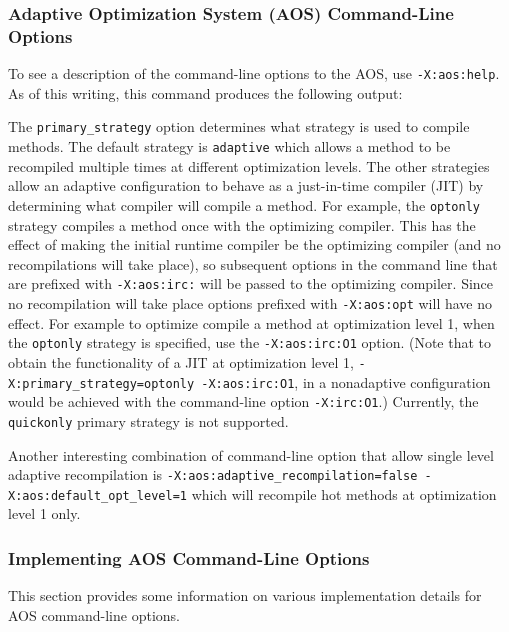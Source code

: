 \subsubsection{Adaptive Optimization System (AOS) Command-Line Options}

To see a description of the command-line options to the
AOS, use {\tt -X:aos:help}.
As of this writing, this command produces the following output:

\T \begin{tiny}

\T \end{tiny}

The {\tt primary\_strategy} option determines what strategy is used to compile
methods.
The default strategy is {\tt adaptive} which allows a method to be
recompiled multiple times at different optimization levels.
The other strategies allow an adaptive configuration to behave as a
just-in-time compiler (JIT) by determining what compiler will compile a method.
For example, the {\tt optonly} strategy compiles a method once with the 
optimizing compiler. This has the effect of making the initial runtime compiler
be the optimizing compiler (and no recompilations will take place), so 
subsequent options in the command line that are prefixed with {\tt -X:aos:irc:}
will be passed to the optimizing compiler. Since no recompilation will take
place options prefixed with {\tt -X:aos:opt} will have no effect.
For example to optimize compile a method at optimization level 1,
when the {\tt optonly} strategy is specified, use the {\tt -X:aos:irc:O1} option.
(Note that to obtain the functionality of a JIT at optimization level 1, 
{\tt -X:primary\_strategy=optonly -X:aos:irc:O1}, in a nonadaptive configuration
would be achieved with the command-line option {\tt -X:irc:O1}.)
Currently, the {\tt quickonly} primary strategy is not supported.


Another interesting combination of command-line option that allow single level
adaptive recompilation is 
{\tt -X:aos:adaptive\_recompilation=false -X:aos:default\_opt\_level=1} 
which will recompile hot methods at optimization level 1 only.

\subsubsection{Implementing AOS Command-Line Options}

This section provides some information on various
implementation details for AOS command-line options.

